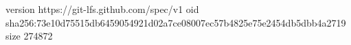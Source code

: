 version https://git-lfs.github.com/spec/v1
oid sha256:73e10d75515db6459054921d02a7ce08007ec57b4825e75e2454db5dbb4a2719
size 274872
